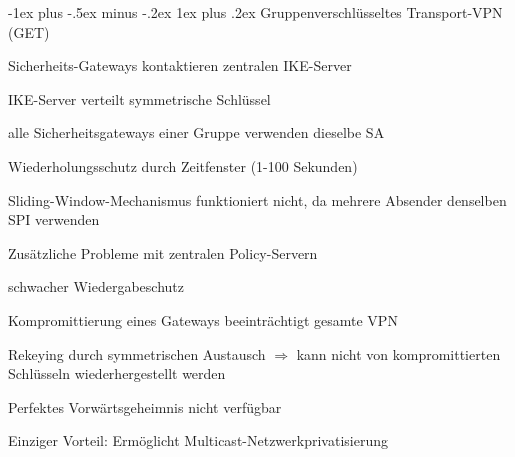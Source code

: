 \documentclass[a4paper]{article}
\makeatletter
\renewcommand{\subsubsection}{\@startsection{subsubsection}{3}{0mm}%
 {-1ex plus -.5ex minus -.2ex}%
 {1ex plus .2ex}%
 {\normalfont\small\bfseries}}
\makeatother
\begin{document}
\begin{multicols}{3}
      \subsubsection{Gruppenverschlüsseltes Transport-VPN (GET)}
      \begin{itemize*}
            \item Sicherheits-Gateways kontaktieren zentralen IKE-Server
            \item IKE-Server verteilt symmetrische Schlüssel %
            \item alle Sicherheitsgateways einer Gruppe verwenden dieselbe SA %
            \item Wiederholungsschutz durch Zeitfenster (1-100 Sekunden)
            \begin{itemize*}
                  \item Sliding-Window-Mechanismus funktioniert nicht, da mehrere Absender denselben SPI verwenden
            \end{itemize*}
            \item Zusätzliche Probleme mit zentralen Policy-Servern
            \begin{itemize*}
                  \item schwacher Wiedergabeschutz
                  \item Kompromittierung eines Gateways beeinträchtigt gesamte VPN
                  \item Rekeying durch symmetrischen Austausch $\Rightarrow$ kann nicht von kompromittierten Schlüsseln wiederhergestellt werden
                  \item Perfektes Vorwärtsgeheimnis nicht verfügbar
            \end{itemize*}
            \item Einziger Vorteil: Ermöglicht Multicast-Netzwerkprivatisierung
      \end{itemize*}


\end{multicols}
\end{document}
